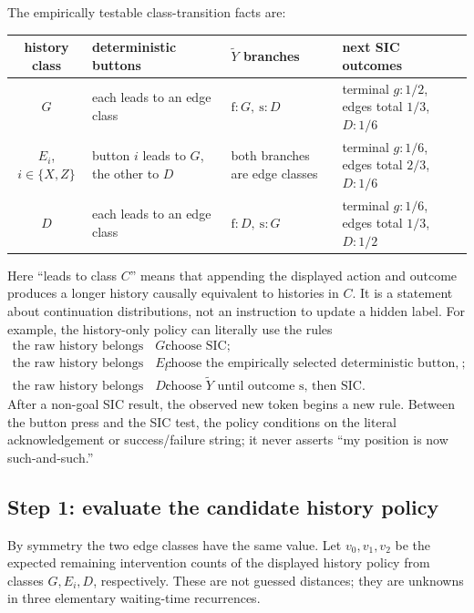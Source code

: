 \documentclass[11pt]{article}
\theoremstyle{definition}
\theoremstyle{remark}
\begin{document}
The empirically testable class-transition facts are:
\begin{center}
\scriptsize
\begin{tabularx}{\textwidth}{c X X X}
\toprule
history class & deterministic buttons & \(\widetilde Y\) branches
 & next SIC outcomes\\
\midrule
\(G\) & each leads to an edge class & \(\mathrm f:G,\ \mathrm s:D\)
 & terminal \(g:1/2\), edges total \(1/3\), \(D:1/6\)\\
\(E_i\), \(i\in\{X,Z\}\) & button \(i\) leads to \(G\), the other to \(D\)
 & both branches are edge classes
 & terminal \(g:1/6\), edges total \(2/3\), \(D:1/6\)\\
\(D\) & each leads to an edge class & \(\mathrm f:D,\ \mathrm s:G\)
 & terminal \(g:1/6\), edges total \(1/3\), \(D:1/2\)\\
\bottomrule
\end{tabularx}
\end{center}
Here ``leads to class \(C\)'' means that appending the displayed action and
outcome produces a longer history causally equivalent to histories in \(C\).
It is a statement about continuation distributions, not an instruction to
update a hidden label.  For example, the history-only policy can literally
use the rules
\[
 \begin{array}{ll}
 \text{the raw history belongs to }G:&\text{choose SIC};\\
 \text{the raw history belongs to }E_i:&
   \text{choose the empirically selected deterministic button, then SIC};\\
 \text{the raw history belongs to }D:&
   \text{choose \(\widetilde Y\) until outcome \(\mathrm s\), then SIC}.
 \end{array}
\]
After a non-goal SIC result, the observed new token begins a new rule.  Between
the button press and the SIC test, the policy conditions on the literal
acknowledgement or success/failure string; it never asserts ``my position is
now such-and-such.''

\subsection{Step 1: evaluate the candidate history policy}

By symmetry the two edge classes have the same value.  Let \(v_0,v_1,v_2\)
be the expected remaining intervention counts of the displayed history policy
from classes \(G,E_i,D\), respectively.  These are not guessed distances; they
are unknowns in three elementary waiting-time recurrences.
\end{document}
